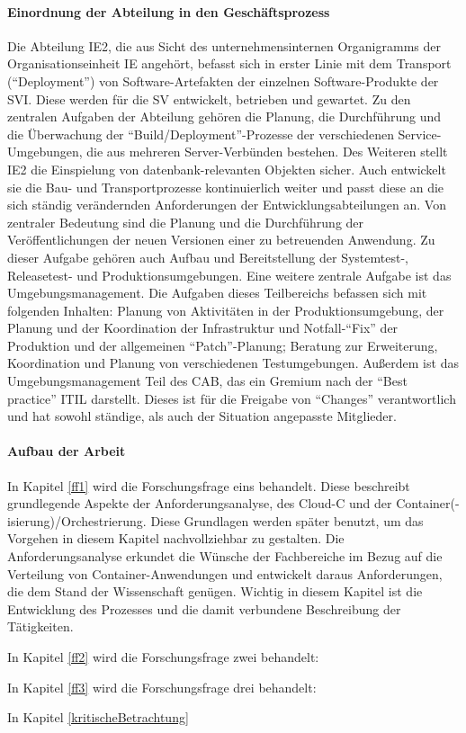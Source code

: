\paragraph{Einordnung der Abteilung in den Geschäftsprozess}
Die Abteilung \ac{IE2}, die aus Sicht des unternehmensinternen Organigramms der Organisationseinheit \ac{IE} angehört, befasst sich in erster Linie mit dem Transport (\enquote{Deployment}) von Software-Artefakten der einzelnen Software-Produkte der \ac{SVI}. Diese werden für die \ac{SV} entwickelt, betrieben und gewartet. Zu den zentralen Aufgaben der Abteilung gehören die Planung, die Durchführung und die Überwachung der \enquote{Build/Deployment}-Prozesse der verschiedenen Service-Umgebungen, die aus mehreren Server-Verbünden bestehen. Des Weiteren stellt \ac{IE2} die Einspielung von datenbank-relevanten Objekten sicher. Auch entwickelt sie die Bau- und Transportprozesse kontinuierlich weiter und passt diese an die sich ständig verändernden Anforderungen der Entwicklungsabteilungen an. Von zentraler Bedeutung sind die Planung und die Durchführung der Veröffentlichungen der neuen Versionen einer zu betreuenden Anwendung. Zu dieser Aufgabe gehören auch Aufbau und Bereitstellung der Systemtest-, Releasetest- und Produktionsumgebungen. Eine weitere zentrale Aufgabe ist das Umgebungsmanagement. Die Aufgaben dieses Teilbereichs befassen sich mit folgenden Inhalten: Planung von Aktivitäten in der Produktionsumgebung, der Planung und der Koordination der Infrastruktur und Notfall-\enquote{Fix} der Produktion und der allgemeinen \enquote{Patch}-Planung; Beratung zur Erweiterung, Koordination und Planung von verschiedenen Testumgebungen. Außerdem ist das Umgebungsmanagement Teil des \ac{CAB}, das ein Gremium nach der \enquote{Best practice} \ac{ITIL} darstellt. Dieses ist für die Freigabe von \enquote{Changes} verantwortlich und hat sowohl ständige, als auch der Situation angepasste Mitglieder. 

\paragraph{Aufbau der Arbeit}
In Kapitel \vref{ff1} wird die Forschungsfrage eins behandelt. Diese beschreibt grundlegende Aspekte der Anforderungsanalyse, des \acl{Cloud-C} und der Container(-isierung)/Orchestrierung. Diese Grundlagen werden später benutzt, um das Vorgehen in diesem Kapitel nachvollziehbar zu gestalten. Die Anforderungsanalyse erkundet die Wünsche der Fachbereiche im Bezug auf die Verteilung von Container-Anwendungen und entwickelt daraus Anforderungen, die dem Stand der Wissenschaft genügen. Wichtig in diesem Kapitel ist die Entwicklung des Prozesses und die damit verbundene Beschreibung der Tätigkeiten.
\par
In Kapitel \vref{ff2} wird die Forschungsfrage zwei behandelt:
\par
In Kapitel \vref{ff3} wird die Forschungsfrage drei behandelt: 
\par
In Kapitel \vref{kritischeBetrachtung} 
